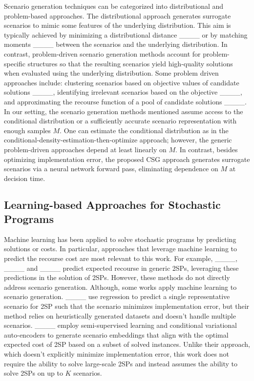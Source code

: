 Scenario generation techniques can be categorized into distributional and problem-based approaches. The distributional approach generates surrogate scenarios to mimic some features of the underlying distribution. This aim is typically achieved by minimizing a distributional distance ____ or by matching moments ____ between the scenarios and the underlying distribution. In contrast, problem-driven scenario generation methods account for problem-specific structures so that the resulting scenarios yield high-quality solutions when evaluated using the underlying distribution. Some problem driven approaches include: clustering scenarios based on objective values of candidate solutions ____, identifying irrelevant scenarios based on the objective ____, and approximating the recourse function of a pool of candidate solutions ____. In our setting, the scenario generation methods mentioned assume access to the conditional distribution or a sufficiently accurate scenario representation with enough samples $M$. One can estimate the conditional distribution as in the conditional-density-estimation-then-optimize approach; however, the generic problem-driven approaches depend at least linearly on $M$. In contrast, besides optimizing implementation error, the proposed CSG approach generates surrogate scenarios via a neural network forward pass, eliminating dependence on $M$ at decision time.




\subsection{Learning-based Approaches for Stochastic Programs}

Machine learning has been applied to solve stochastic programs by predicting solutions or costs. In particular, approaches that leverage machine learning to predict the recourse cost are most relevant to this work. For example, ____, ____ and ____ predict expected recourse in generic 2SPs, leveraging these predictions in the solution of 2SPs. However, these methods do not directly address scenario generation. Although, some works apply machine learning to scenario generation. ____ use regression to predict a single representative scenario for 2SP such that the scenario minimizes implementation error, but their method relies on heuristically generated datasets and doesn't handle multiple scenarios. ____ employ semi-supervised learning and conditional variational auto-encoders to generate scenario embeddings that align with the optimal expected cost of 2SP based on a subset of solved instances. Unlike their approach, which doesn't explicitly minimize implementation error, this work does not require the ability to solve large-scale 2SPs and instead assumes the ability to solve 2SPs on up to $K$ scenarios.